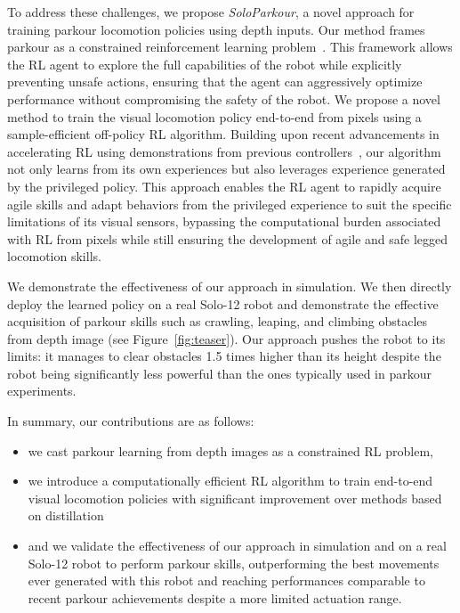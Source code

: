 To address these challenges, we propose \textit{SoloParkour}, a novel approach for training parkour locomotion policies using depth inputs.
Our method frames parkour as a constrained reinforcement learning problem~\citep{lee2023evaluation, kim2024not, chane2024cat}.
This framework allows the RL agent to explore the full capabilities of the robot while explicitly preventing unsafe actions, ensuring that the agent can aggressively optimize performance without compromising the safety of the robot.
We propose a novel method to train the visual locomotion policy end-to-end from pixels using a sample-efficient off-policy RL algorithm.
Building upon recent advancements in accelerating RL using demonstrations from previous controllers~\citep{ball2023efficient, smith2023learning}, our algorithm not only learns from its own experiences but also leverages experience generated by the privileged policy.
This approach enables the RL agent to rapidly acquire agile skills and adapt behaviors from the privileged experience to suit the specific limitations of its visual sensors, bypassing the computational burden associated with RL from pixels while still ensuring the development of agile and safe legged locomotion skills.

We demonstrate the effectiveness of our approach in simulation.
We then directly deploy the learned policy on a real Solo-12 robot and demonstrate the effective acquisition of parkour skills such as crawling, leaping, and climbing obstacles from depth image (see Figure~\ref{fig:teaser}).
Our approach pushes the robot to its limits: it manages to clear obstacles 1.5 times higher than its height despite the robot being significantly less powerful than the ones typically used in parkour experiments.

In summary, our contributions are as follows:
\begin{itemize}
\item we cast parkour learning from depth images as a constrained RL problem,
\item we introduce a computationally efficient RL algorithm to train end-to-end visual locomotion policies with significant improvement over methods based on distillation
\item and we validate the effectiveness of our approach in simulation and on a real Solo-12 robot to perform parkour skills, outperforming the best movements ever generated with this robot and reaching performances comparable to recent parkour achievements despite a more limited actuation range.
\end{itemize}
